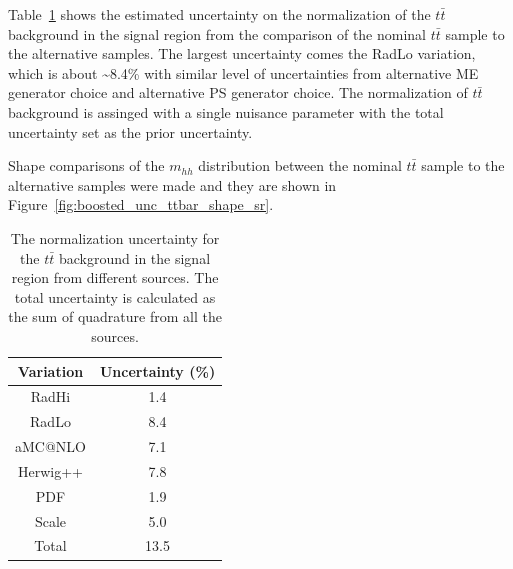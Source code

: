 Table~\ref{tab:boosted_unc_ttbar} shows the estimated uncertainty on the normalization of the $t\bar{t}$ background in the signal region
from the comparison of the nominal $t\bar{t}$ sample to the alternative samples. The largest uncertainty comes the RadLo variation,
which is about \textasciitilde8.4\% with similar level of uncertainties from alternative ME generator choice and alternative PS generator choice.
The normalization of $t\bar{t}$ background is assinged with a single nuisance parameter with the total uncertainty set as the prior uncertainty.
 
Shape comparisons of the $m_{hh}$ distribution between the nominal $t\bar{t}$ sample to the alternative samples were made and they are shown in
Figure~\ref{fig:boosted_unc_ttbar_shape_sr}. %
 
\begin{table}[htbp!]
\begin{center}
\begin{tabular}{c|c}
Variation  &  Uncertainty (\%) \\
\hline
RadHi      &                 1.4 \\
RadLo      &                 8.4 \\
aMC@NLO    &                 7.1 \\
Herwig++   &                 7.8 \\
PDF        &                 1.9 \\
Scale      &                 5.0 \\
\hline
Total      &                13.5 \\
\end{tabular}
\end{center}
\caption[The normalization uncertainty for the $t\bar{t}$ background in the SR
from different sources]{The normalization uncertainty for the $t\bar{t}$ background in the signal region
from different sources. The total uncertainty is calculated as the sum of quadrature from all
the sources.}
\label{tab:boosted_unc_ttbar}
\end{table}
 
